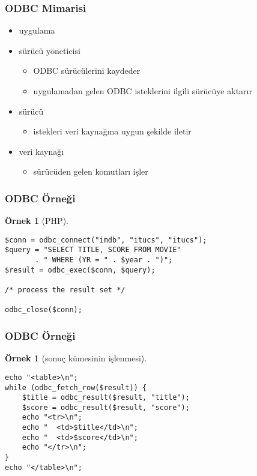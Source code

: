 \documentclass[dvipsnames]{beamer}
\theoremstyle{definition}
\theoremstyle{example}
\newtheorem{ornek}[theorem]{Örnek}
\theoremstyle{plain}
\begin{document}
\begin{frame}
  \frametitle{ODBC Mimarisi}

  \begin{itemize}
    \item uygulama

    \pause
    \item sürücü yöneticisi
    \begin{itemize}
      \item ODBC sürücülerini kaydeder
      \item uygulamadan gelen ODBC isteklerini ilgili sürücüye aktarır
    \end{itemize}

    \pause
    \item sürücü
    \begin{itemize}
      \item istekleri veri kaynağına uygun şekilde iletir
    \end{itemize}

    \pause
    \item veri kaynağı
    \begin{itemize}
      \item sürücüden gelen komutları işler
    \end{itemize}
  \end{itemize}
\end{frame}

\begin{frame}[fragile]
  \frametitle{ODBC Örneği}

  \begin{ornek}[PHP]
    \begin{lstlisting}
$conn = odbc_connect("imdb", "itucs", "itucs");
$query = "SELECT TITLE, SCORE FROM MOVIE"
       . " WHERE (YR = " . $year . ")";
$result = odbc_exec($conn, $query);

/* process the result set */

odbc_close($conn);
    \end{lstlisting}
  \end{ornek}
\end{frame}

\begin{frame}[fragile]
  \frametitle{ODBC Örneği}

  \begin{ornek}[sonuç kümesinin işlenmesi]
    \begin{lstlisting}
echo "<table>\n";
while (odbc_fetch_row($result)) {
    $title = odbc_result($result, "title");
    $score = odbc_result($result, "score");
    echo "<tr>\n";
    echo "  <td>$title</td>\n";
    echo "  <td>$score</td>\n";
    echo "</tr>\n";
}
echo "</table>\n";
    \end{lstlisting}
  \end{ornek}
\end{frame}
\end{document}
